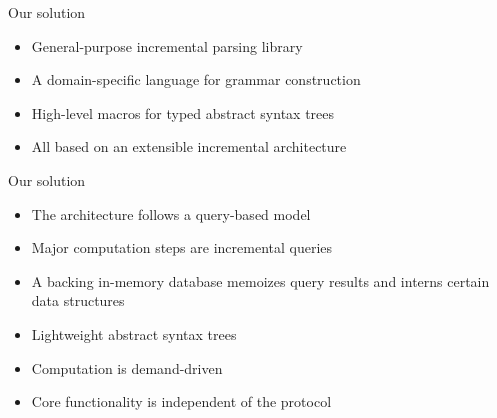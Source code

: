 \documentclass[aspectratio=169]{beamer}
\begin{document}
\begin{frame}{Our solution}
	\begin{itemize}
		\item General-purpose \alert{incremental parsing} library \pause
		\item A domain-specific language for grammar construction \pause
		\item High-level macros for \alert{typed abstract syntax trees} \pause
		\item All based on an extensible incremental architecture
	\end{itemize}
\end{frame}

\begin{frame}{Our solution}
	\begin{itemize}
		\item The architecture follows a \alert{query-based model} \pause
		\item Major computation steps are \alert{incremental queries} \pause
		\item A backing in-memory database memoizes query results and interns
		certain data structures \pause
		\item Lightweight abstract syntax trees \pause
		\item Computation is \alert{demand-driven} \pause
		\item Core functionality is independent of the protocol
	\end{itemize}
\end{frame}
\end{document}
